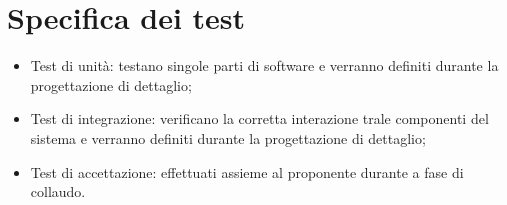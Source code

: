 \section{Specifica dei test}
\begin{itemize}
    \item Test di unità: testano singole parti di software e verranno definiti durante la progettazione di dettaglio;
    \item Test di integrazione: verificano la corretta interazione trale componenti del sistema e verranno definiti durante la progettazione di dettaglio;
    \item Test di accettazione: effettuati assieme al proponente durante a fase di collaudo.
\end{itemize}